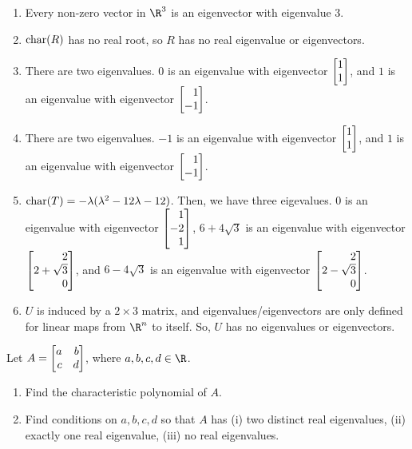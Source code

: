 \begin{exercises}
\begin{problist}
		\begin{solution}
		    \begin{enumerate}
		        \item Every non-zero vector in $\R^3$ is an eigenvector with eigenvalue 3. \newline
		        \item $\operatorname{char}(R)$ has no real root, so $R$ has no real eigenvalue or eigenvectors. \newline
		        \item There are two eigenvalues. $0$ is an eigenvalue with eigenvector $\mat{1 \\ 1}$, and $1$ is an eigenvalue with eigenvector $\mat{1\\-1}$. \newline
		        \item There are two eigenvalues. $-1$ is an eigenvalue with eigenvector $\mat{1\\1}$, and $1$ is an eigenvalue with eigenvector $\mat{1 \\ -1}$. \newline
		        \item $\operatorname{char}(T) = - \lambda ( \lambda^2 - 12 \lambda - 12)$. Then, we have three eigevalues. $0$ is an eigenvalue with eigenvector $\mat{1 \\ -2 \\ 1}$, $6 + 4 \sqrt{3}$ is an eigenvalue with eigenvector $\mat{2 \\ 2 + \sqrt{3} \\ 0}$, and $6 - 4\sqrt{3}$ is an eigenvalue with eigenvector $\mat{2 \\ 2 - \sqrt{3} \\ 0}$. \newline
		        \item $U$ is induced by a $2 \times 3$ matrix, and eigenvalues/eigenvectors are only defined for linear maps from $\R^n$ to itself. So, $U$ has no eigenvalues or eigenvectors.
		    \end{enumerate}
		\end{solution}

		\prob Let $A = \mat{a&b\\c&d}$, where $a,b,c,d \in \R$.
		\begin{enumerate}
			\item Find the characteristic polynomial of $A$.
		
			\item Find conditions on $a,b,c,d$ so that $A$ has (i) two distinct
				real eigenvalues, (ii) exactly one real eigenvalue, (iii) no
				real eigenvalues.
		\end{enumerate}
		

\end{problist}
\end{exercises}
